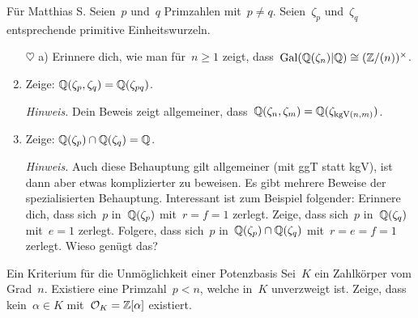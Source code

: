 \documentclass{uebblatt}
\begin{document}
\begin{aufgabe}{Für Matthias S.}
Seien~$p$ und~$q$ Primzahlen mit~$p \neq q$. Seien~$\zeta_p$ und~$\zeta_q$
entsprechende primitive Einheitswurzeln.
\begin{enumerate}
\item[$\heartsuit$ a)] Erinnere dich, wie man für~$n \geq 1$ zeigt,
dass~$\mathrm{Gal}(\mathbb{Q}(\zeta_n)|\mathbb{Q}) \cong (\mathbb{Z}/(n))^\times$.
\addtocounter{enumi}{1}

\item Zeige: $\mathbb{Q}(\zeta_p, \zeta_q) = \mathbb{Q}(\zeta_{pq})$.

{\tiny\emph{Hinweis.} Dein Beweis zeigt allgemeiner, dass~$\mathbb{Q}(\zeta_n,
\zeta_m) = \mathbb{Q}(\zeta_{\operatorname{kgV}(n,m)})$.\par}
\item Zeige: $\mathbb{Q}(\zeta_p) \cap \mathbb{Q}(\zeta_q) = \mathbb{Q}$.

{\tiny\emph{Hinweis.} Auch diese Behauptung gilt allgemeiner (mit ggT statt
kgV), ist dann aber etwas komplizierter zu beweisen. Es gibt mehrere Beweise
der spezialisierten Behauptung. Interessant ist zum Beispiel folgender:
Erinnere dich, dass sich~$p$ in~$\mathbb{Q}(\zeta_p)$ mit~$r = f = 1$ zerlegt. Zeige,
dass sich~$p$ in~$\mathbb{Q}(\zeta_q)$ mit~$e = 1$ zerlegt. Folgere, dass sich~$p$
in~$\mathbb{Q}(\zeta_p) \cap \mathbb{Q}(\zeta_q)$ mit~$r = e = f = 1$ zerlegt. Wieso genügt
das?\par}
\end{enumerate}
\end{aufgabe}

\begin{aufgabe}{Ein Kriterium für die Unmöglichkeit einer Potenzbasis}
Sei~$K$ ein Zahlkörper vom Grad~$n$. Existiere eine Primzahl~$p < n$, welche
in~$K$ unverzweigt ist. Zeige, dass kein~$\alpha \in K$ mit~$\mathcal{O}_K =
\mathbb{Z}[\alpha]$ existiert.
\end{aufgabe}
\end{document}
